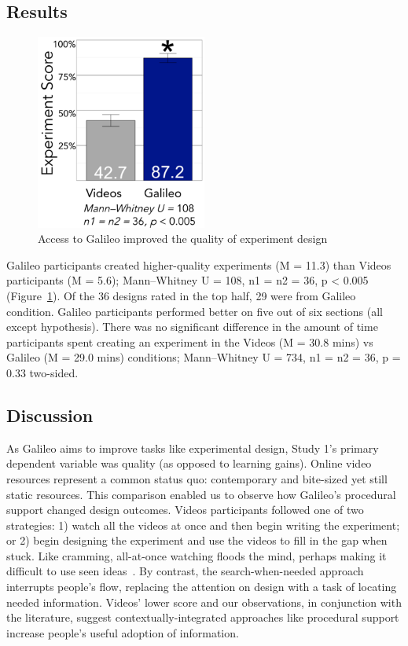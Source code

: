 \subsection*{Results}

\begin{figure}
  \includegraphics[width=0.5\textwidth]{figures/galileo/galileo-study1-7}
  \caption[Access to Galileo improved the quality of experiment design]
{Access to Galileo improved the quality of experiment design}
  \label{fig:galileo-result}
\end{figure}

Galileo participants created higher-quality experiments (M = 11.3) than Videos participants (M = 5.6); Mann–Whitney U = 108, n1 = n2 = 36, p < 0.005 (Figure~\ref{fig:galileo-result}). Of the 36 designs rated in the top half, 29 were from Galileo condition. Galileo participants performed better on five out of six sections (all except hypothesis). There was no significant difference in the amount of time participants spent creating an experiment in the Videos (M = 30.8 mins) vs Galileo (M = 29.0 mins) conditions; Mann–Whitney U = 734, n1 = n2 = 36, p = 0.33 two-sided. 

\subsection*{Discussion}
As Galileo aims to improve tasks like experimental design, Study 1's primary dependent variable was quality (as opposed to learning gains). Online video resources represent a common status quo: contemporary and bite-sized yet still static resources. This comparison enabled us to observe how Galileo's procedural support changed design outcomes. Videos participants followed one of two strategies: 1) watch all the videos at once and then begin writing the experiment; or 2) begin designing the experiment and use the videos to fill in the gap when stuck. Like cramming, all-at-once watching floods the mind, perhaps making it difficult to use seen ideas~\cite{kornell2009optimising}. By contrast, the search-when-needed approach interrupts people's flow, replacing the attention on design with a task of locating needed information. Videos' lower score and our observations, in conjunction with the literature, suggest contextually-integrated approaches like procedural support increase people's useful adoption of information.
   
